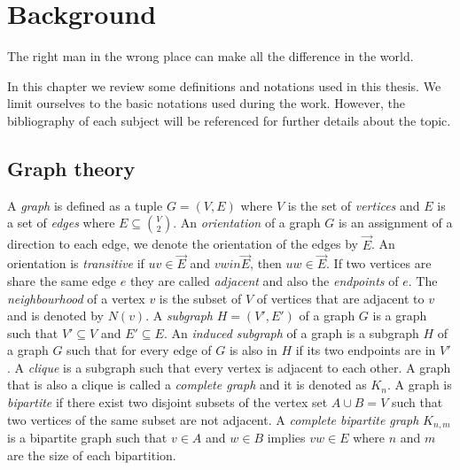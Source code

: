 \chapter{Background}
\label{chap:background}

\begin{fquote}
  The right man in the wrong place can make all the difference in the world.
\end{fquote}

In this chapter we review some definitions and notations used in this thesis. We limit ourselves to the basic notations used during the work. However, the bibliography of each subject will be referenced for further details about the topic.


%
%
%

\section{Graph theory}

A \emph{graph} is defined as a tuple $G = (V,E)$ where $V$ is the set of \emph{vertices} and $E$ is a set of \emph{edges} where $E \subseteq \binom{V}{2}$. An \emph{orientation} of a graph $G$ is an assignment of a direction to each edge, we denote the orientation of the edges by $\overrightarrow{E}$. An orientation is \emph{transitive} if $uv \in \overrightarrow{E}$ and $vw in \overrightarrow{E}$, then $uw \in \overrightarrow{E}$. If two vertices are share the same edge $e$ they are called \emph{adjacent} and also the \emph{endpoints} of $e$. The \emph{neighbourhood} of a vertex $v$ is the subset of $V$ of vertices that are adjacent to $v$ and is denoted by $N(v)$. A \emph{subgraph} $H = (V', E')$ of a graph $G$ is a graph such that $V' \subseteq V$ and $E' \subseteq E$. An \emph{induced subgraph} of a graph is a subgraph $H$ of a graph $G$ such that for every edge of $G$ is also in $H$ if its two endpoints are in $V'$. A \emph{clique} is a subgraph such that every vertex is adjacent to each other. A graph that is also a clique is called a \emph{complete graph} and it is denoted as $K_n$. A graph is \emph{bipartite} if there exist two disjoint subsets of the vertex set $A \cup B = V$ such that two vertices of the same subset are not adjacent. A \emph{complete bipartite graph} $K_{n,m}$ is a bipartite graph such that $v \in A$ and $w \in B$ implies $vw \in E$ where $n$ and $m$ are the size of each bipartition.

